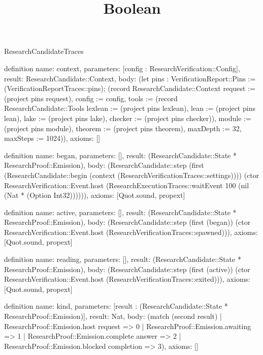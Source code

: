 \begin{lexlean}{ResearchCandidateTraces}
\title{Boolean}
\begin{semanticmodule}

definition{
 name: context,
 parameters: [config : ResearchVerification::Config],
 result: ResearchCandidate::Context,
 body: (let pins : VerificationReport::Pins := (VerificationReportTraces::pins); (record ResearchCandidate::Context {request := (project pins request), config := config, tools := (record ResearchCandidate::Tools {lexlean := (project pins lexlean), lean := (project pins lean), lake := (project pins lake), checker := (project pins checker)}), module := (project pins module), theorem := (project pins theorem), maxDepth := 32, maxSteps := 1024})),
 axioms: []
}

definition{
 name: began,
 parameters: [],
 result: (ResearchCandidate::State * ResearchProof::Emission),
 body: (ResearchCandidate::step (first (ResearchCandidate::begin (context (ResearchVerificationTraces::settings)))) (ctor ResearchVerification::Event.host (ResearchExecutionTraces::waitEvent 100 (nil (Nat * (Option Int32)))))),
 axioms: [Quot.sound, propext]
}

definition{
 name: active,
 parameters: [],
 result: (ResearchCandidate::State * ResearchProof::Emission),
 body: (ResearchCandidate::step (first (began)) (ctor ResearchVerification::Event.host (ResearchVerificationTraces::spawned))),
 axioms: [Quot.sound, propext]
}

definition{
 name: reading,
 parameters: [],
 result: (ResearchCandidate::State * ResearchProof::Emission),
 body: (ResearchCandidate::step (first (active)) (ctor ResearchVerification::Event.host (ResearchVerificationTraces::exited))),
 axioms: [Quot.sound, propext]
}

definition{
 name: kind,
 parameters: [result : (ResearchCandidate::State * ResearchProof::Emission)],
 result: Nat,
 body: (match (second result) | ResearchProof::Emission.host request => 0 | ResearchProof::Emission.awaiting => 1 | ResearchProof::Emission.complete answer => 2 | ResearchProof::Emission.blocked completion => 3),
 axioms: []
}


\end{semanticmodule}
\end{lexlean}

